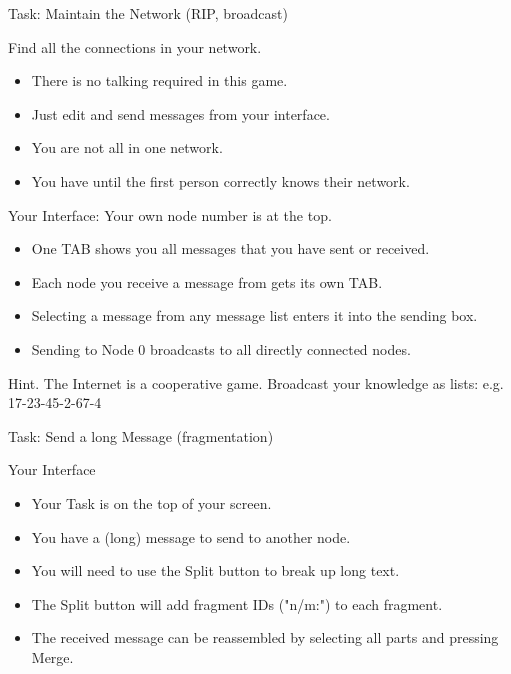 \documentclass[svgnames]{beamer}
\begin{document}
\begin{frame}{Task: Maintain the Network (RIP, broadcast)}
\vspace*{-2mm}
\begin{alertblock}{Find all the connections in your network.}
\begin{itemize}
\item \alert{There is no talking required in this game}.
\item Just edit and send messages from your interface.
\item You are \alert{not all in one network}.
\item \large You have until the first person correctly knows their network.
\end{itemize}
\end{alertblock}

\vspace*{-2mm}
\begin{block}{Your Interface: Your own node number is at the top.}
\begin{itemize}
\item One TAB shows you all messages that you have sent or received.
\item Each node you receive a message from gets its own TAB.
\item Selecting a message from any message list enters it into the sending box.
\item Sending to Node 0 broadcasts to all \alert{directly} connected nodes.
\end{itemize}
\end{block}
\pause
\begin{alertblock}{Hint. The Internet is a cooperative game.}
{Broadcast your knowledge as lists: e.g. 17-23-45-2-67-4}
\end{alertblock}
\end{frame}

\begin{frame}{Task: Send a long Message (fragmentation)}
\begin{block}{Your Interface}
\begin{itemize}
\item Your Task is on the top of your screen.
\item You have a (long) message to send to another node.
\item You will need to use the \alert{Split} button to break up long text.
\item The \alert{Split} button will add fragment IDs (\alert{"n/m:"}) to each fragment.
\item The received message can be reassembled by selecting all parts and pressing \alert{Merge}.
\end{itemize}
\end{block}
\end{frame}
\end{document}
